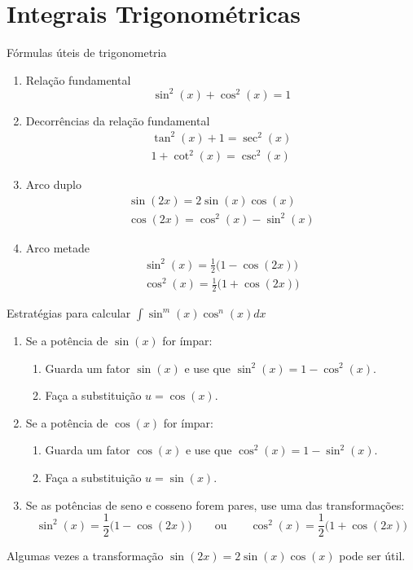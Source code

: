 \section{Integrais Trigonométricas}
\label{sec:Integais_Trigonometricas}

Fórmulas úteis de trigonometria
\begin{enumerate}
  \item
    Relação fundamental
    \[
      \sin^2(x)+ \cos^2(x)=1
    \]

  \item
    Decorrências da relação fundamental
    \begin{gather*}
      \tan^2(x)+ 1  = \sec^2(x) \\
      1 + \cot^2(x) = \csc^2(x)
    \end{gather*}

  \item
    Arco duplo
    \begin{gather*}
      \sin(2x) = 2\sin(x) \cos(x) \\
      \cos(2x) = \cos^2(x)-\sin^2(x)
    \end{gather*}
  \item
    Arco metade
    \begin{gather*}
      \sin^2(x)= \frac{1}{2}\big(1-\cos(2x)\big) \\
      \cos^2(x)= \frac{1}{2}\big(1+\cos(2x)\big)
    \end{gather*}
\end{enumerate}

Estratégias para calcular \(\int \sin^m(x) \cos^n(x)dx\)
\begin{enumerate}
  \item Se a potência de $\sin(x)$ for ímpar:
    \begin{enumerate}
      \item Guarda um fator $\sin(x)$ e use que $\sin^2(x)=1- \cos^2(x)$.
      \item Faça a substituição $u=\cos(x)$.
    \end{enumerate}

  \item Se a potência de $\cos(x)$ for ímpar:
    \begin{enumerate}
      \item Guarda um fator $\cos(x)$ e use que $\cos^2(x)=1- \sin^2(x)$.
      \item Faça a substituição $u=\sin(x)$.
    \end{enumerate}

  \item Se as potências de seno e cosseno forem pares, use uma das transformações:
    \[
      \sin^2(x)= \frac{1}{2}\big(1-\cos(2x)\big) \qquad\text{ou}\qquad
      \cos^2(x)= \frac{1}{2}\big(1+\cos(2x)\big)
    \]
\end{enumerate}
Algumas vezes a transformação $\sin(2x)=2\sin(x)\cos(x)$ pode ser útil.

